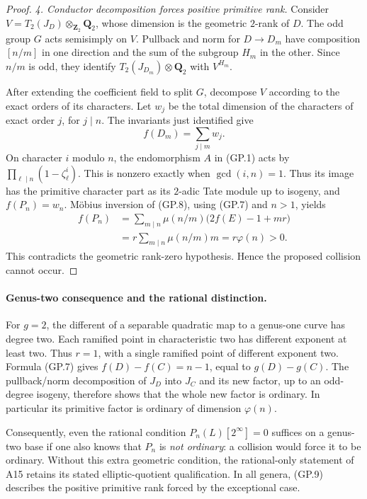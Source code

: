 \documentclass[11pt,a4paper]{article}
\begin{document}
\begin{proof}
\emph{4. Conductor decomposition forces positive primitive rank.}
Consider
$V=T_2(J_D)\otimes_{\mathbf Z_2}\mathbf Q_2$,
whose dimension is the geometric $2$-rank of $D$.
The odd group $G$ acts semisimply on $V$.
Pullback and norm for $D\to D_m$ have composition
$[n/m]$ in one direction and the sum of the subgroup
$H_m$ in the other.  Since $n/m$ is odd, they identify
$T_2(J_{D_m})\otimes\mathbf Q_2$ with $V^{H_m}$.

After extending the coefficient field to split $G$, decompose
$V$ according to the exact orders of its characters.
Let $w_j$ be the total dimension of the characters of exact
order $j$, for $j\mid n$.  The invariants just identified give
\[
                           f(D_m)=\sum_{j\mid m}w_j.
 \tag{GP.8}
\]
On character $i$ modulo $n$, the endomorphism $A$ in (GP.1)
acts by
$\prod_{\ell\mid n}(1-\zeta_\ell^i)$.
This is nonzero exactly when $\gcd(i,n)=1$.
Thus its image has the primitive character part as its
$2$-adic Tate module up to isogeny, and
$f(P_n)=w_n$.
M\"obius inversion of (GP.8), using (GP.7) and $n>1$, yields
\[
\begin{aligned}
 f(P_n)
   &=\sum_{m\mid n}\mu(n/m)\bigl(2f(E)-1+mr\bigr)\\
   &=r\sum_{m\mid n}\mu(n/m)m
     =r\varphi(n)>0.
\end{aligned}
 \tag{GP.9}
\]
This contradicts the geometric rank-zero hypothesis.
Hence the proposed collision cannot occur.
\end{proof}

\paragraph{Genus-two consequence and the rational distinction.}
For $g=2$, the different of a separable quadratic map to a
genus-one curve has degree two.  Each ramified point in
characteristic two has different exponent at least two.
Thus $r=1$, with a single ramified point of different exponent
two.  Formula (GP.7) gives
$f(D)-f(C)=n-1$, equal to $g(D)-g(C)$.
The pullback/norm decomposition of $J_D$ into $J_C$ and its
new factor, up to an odd-degree isogeny, therefore shows that
the whole new factor is ordinary.  In particular its primitive
factor is ordinary of dimension $\varphi(n)$.

Consequently, even the rational condition
$P_n(L)[2^\infty]=0$ suffices on a genus-two base if one also
knows that $P_n$ is \emph{not ordinary}: a collision would force
it to be ordinary.  Without this extra geometric condition,
the rational-only statement of A15 retains its stated
elliptic-quotient qualification.  In all genera, (GP.9)
describes the positive primitive rank forced by the
exceptional case.
\end{document}
